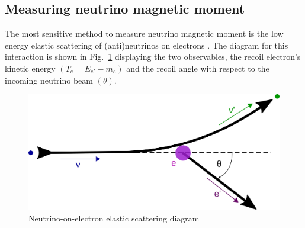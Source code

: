 

\subsection{Measuring neutrino magnetic moment}\label{sec:MeasuringNuMM}
The most sensitive method to measure neutrino magnetic moment is the low energy elastic scattering of (anti)neutrinos on electrons \cite{nuElmagInt2015.pdf}. The diagram for this interaction is shown in Fig.~\ref{fig:NuoneDiagram} displaying the two observables, the recoil electron's kinetic energy $\left(T_e=E_{e\prime}-m_e\right)$ and the recoil angle with respect to the incoming neutrino beam $\left(\theta\right)$.
\begin{figure}[hbtp]
\centering
\includegraphics[width=0.55\linewidth]{Plots/NuMM/NuoneInteraction.png}
\caption{Neutrino-on-electron elastic scattering diagram}
\label{fig:NuoneDiagram}
\end{figure}

